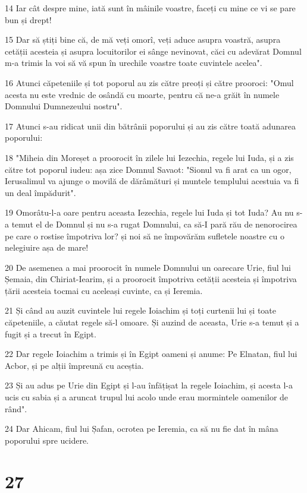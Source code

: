 \par 14 Iar cât despre mine, iată sunt în mâinile voastre, faceți cu mine ce vi se pare bun și drept!
\par 15 Dar să știți bine că, de mă veți omorî, veți aduce asupra voastră, asupra cetății acesteia și asupra locuitorilor ei sânge nevinovat, căci cu adevărat Domnul m-a trimis la voi să vă spun în urechile voastre toate cuvintele acelea".
\par 16 Atunci căpeteniile și tot poporul au zis către preoți și către prooroci: "Omul acesta nu este vrednic de osândă cu moarte, pentru că ne-a grăit în numele Domnului Dumnezeului nostru".
\par 17 Atunci s-au ridicat unii din bătrânii poporului și au zis către toată adunarea poporului:
\par 18 "Miheia din Moreșet a proorocit în zilele lui Iezechia, regele lui Iuda, și a zis către tot poporul iudeu: așa zice Domnul Savaot: "Sionul va fi arat ca un ogor, Ierusalimul va ajunge o movilă de dărâmături și muntele templului acestuia va fi un deal împădurit".
\par 19 Omorâtu-l-a oare pentru aceasta Iezechia, regele lui Iuda și tot Iuda? Au nu s-a temut el de Domnul și nu s-a rugat Domnului, ca să-I pară rău de nenorocirea pe care o rostise împotriva lor? și noi să ne împovărăm sufletele noastre cu o nelegiuire așa de mare!
\par 20 De asemenea a mai proorocit în numele Domnului un oarecare Urie, fiul lui Șemaia, din Chiriat-Iearim, și a proorocit împotriva cetății acesteia și împotriva țării acesteia tocmai cu aceleași cuvinte, ca și Ieremia.
\par 21 Și când au auzit cuvintele lui regele Ioiachim și toți curtenii lui și toate căpeteniile, a căutat regele să-l omoare. Și auzind de aceasta, Urie s-a temut și a fugit și a trecut în Egipt.
\par 22 Dar regele Ioiachim a trimis și în Egipt oameni și anume: Pe Elnatan, fiul lui Acbor, și pe alții împreună cu aceștia.
\par 23 Și au adus pe Urie din Egipt și l-au înfățișat la regele Ioiachim, și acesta l-a ucis cu sabia și a aruncat trupul lui acolo unde erau mormintele oamenilor de rând".
\par 24 Dar Ahicam, fiul lui Șafan, ocrotea pe Ieremia, ca să nu fie dat în mâna poporului spre ucidere.

\chapter{27}

